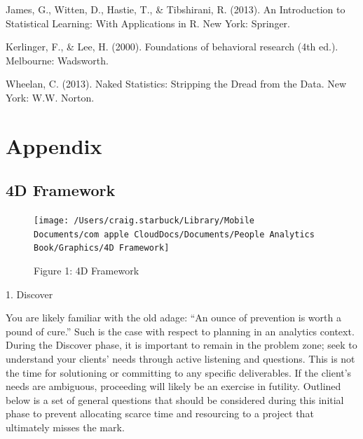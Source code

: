 \documentclass[]{book}
\begin{document}
James, G., Witten, D., Hastie, T., \& Tibshirani, R. (2013). An Introduction to Statistical Learning: With Applications in R. New York: Springer.

Kerlinger, F., \& Lee, H. (2000). Foundations of behavioral research (4th ed.). Melbourne: Wadsworth.

Wheelan, C. (2013). Naked Statistics: Stripping the Dread from the Data. New York: W.W. Norton.

\hypertarget{appendix}{%
\chapter{Appendix}\label{appendix}}

\hypertarget{d-framework-1}{%
\section{4D Framework}\label{d-framework-1}}

\begin{figure}
\texttt{[image: /Users/craig.starbuck/Library/Mobile Documents/com~apple~CloudDocs/Documents/People Analytics Book/Graphics/4D Framework]} \caption{Figure 1: 4D Framework}\label{fig:unnamed-chunk-7}
\end{figure}

1. Discover

You are likely familiar with the old adage: ``An ounce of prevention is worth a pound of cure.'' Such is the case with respect to planning in an analytics context. During the Discover phase, it is important to remain in the problem zone; seek to understand your clients' needs through active listening and questions. This is not the time for solutioning or committing to any specific deliverables. If the client's needs are ambiguous, proceeding will likely be an exercise in futility. Outlined below is a set of general questions that should be considered during this initial phase to prevent allocating scarce time and resourcing to a project that ultimately misses the mark.
\end{document}
